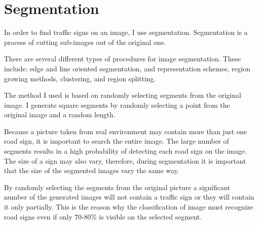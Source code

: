 \chapter{Segmentation}\label{ch:SEGMENT}

In order to find traffic signs on an image, I use segmentation. Segmentation is a process of cutting sub-images out of the original one. 

There are several different types of procedures for image segmentation. These include: edge and line oriented segmentation, and representation schemes, region growing methods, clustering, and region splitting.

The method I used is based on randomly selecting segments from the original image. I generate square segments by randomly selecting a point from the original image and a random length.

Because a picture taken from real environment may contain more than just one road sign, it is important to search the entire image. The large number of segments results in a high probability of detecting each road sign on the image. The size of a sign may also vary, therefore, during segmentation it is important that the size of the segmented images vary the same way. 

By randomly selecting the segments from the original picture a significant number of the generated images will not contain a traffic sign or they will contain it only partially. This is the reason why the classification of image must recognize road signs even if only 70-80\% is visible on the selected segment.
